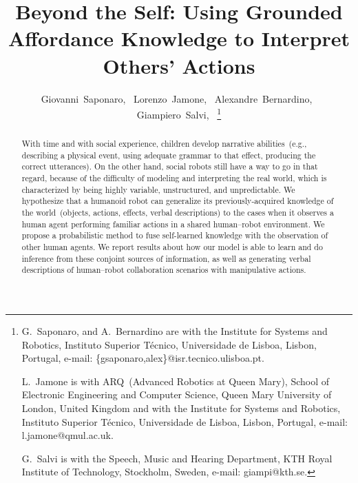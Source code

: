 \documentclass[journal]{IEEEtran}
\newcommand{\hr}{human--robot}
\begin{document}
\title{Beyond the Self: Using Grounded Affordance Knowledge to Interpret Others' Actions}

\author{Giovanni~Saponaro,~
        Lorenzo~Jamone,~
        Alexandre~Bernardino,~
        Giampiero~Salvi,~
\thanks{G.~Saponaro, and A.~Bernardino are with the
Institute for Systems and Robotics, Instituto Superior Técnico,
Universidade de Lisboa, Lisbon, Portugal, e-mail: \{gsaponaro,alex\}@isr.tecnico.ulisboa.pt.

L.~Jamone is with ARQ~(Advanced Robotics at Queen Mary), School of Electronic Engineering and Computer Science, Queen Mary University of London, United Kingdom
and with the
Institute for Systems and Robotics, Instituto Superior Técnico, Universidade de Lisboa, Lisbon, Portugal,
e-mail: l.jamone@qmul.ac.uk.

G.~Salvi is with the Speech, Music and Hearing Department,
KTH Royal Institute of Technology, Stockholm, Sweden,
e-mail: giampi@kth.se.
}}

\maketitle

\begin{abstract}
With time and with social experience, children develop narrative abilities~(e.g., describing a physical event, using adequate grammar to that effect, producing the correct utterances).
On the other hand, social robots still have a way to go in that regard, because of the difficulty of modeling and interpreting the real world, which is characterized by being highly variable, unstructured, and unpredictable.
We hypothesize that a humanoid robot can generalize its previously-acquired knowledge of the world~(objects, actions, effects, verbal descriptions) to the cases when it observes a human agent performing familiar actions in a shared \hr{} environment.
We propose a probabilistic method to fuse self-learned knowledge with the observation of other human agents.
We report results about how our model is able to learn and do inference from these conjoint sources of information, as well as generating verbal descriptions of \hr{} collaboration scenarios with manipulative actions.
\end{abstract}
\end{document}
